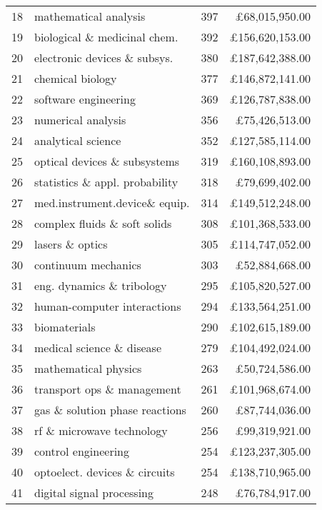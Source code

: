 \begin{spacing}{0.9}
\begin{longtable}[c]{r|>{\raggedleft\arraybackslash}m{6.5cm}|>{\raggedleft\arraybackslash}m{1.9cm}|r}
{18} & {mathematical analysis} & {397} & {\pounds68,015,950.00}\\
{19} & {biological \& medicinal chem.} & {392} & {\pounds156,620,153.00}\\
{20} & {electronic devices \& subsys.} & {380} & {\pounds187,642,388.00}\\
{21} & {chemical biology} & {377} & {\pounds146,872,141.00}\\
{22} & {software engineering} & {369} & {\pounds126,787,838.00}\\
{23} & {numerical analysis} & {356} & {\pounds75,426,513.00}\\
{24} & {analytical science} & {352} & {\pounds127,585,114.00}\\
{25} & {optical devices \& subsystems} & {319} & {\pounds160,108,893.00}\\
{26} & {statistics \& appl. probability} & {318} & {\pounds79,699,402.00}\\
{27} & {med.instrument.device\& equip.} & {314} & {\pounds149,512,248.00}\\
{28} & {complex fluids \& soft solids} & {308} & {\pounds101,368,533.00}\\
{29} & {lasers \& optics} & {305} & {\pounds114,747,052.00}\\
{30} & {continuum mechanics} & {303} & {\pounds52,884,668.00}\\
{31} & {eng. dynamics \& tribology} & {295} & {\pounds105,820,527.00}\\
{32} & {human-computer interactions} & {294} & {\pounds133,564,251.00}\\
{33} & {biomaterials} & {290} & {\pounds102,615,189.00}\\
{34} & {medical science \& disease} & {279} & {\pounds104,492,024.00}\\
{35} & {mathematical physics} & {263} & {\pounds50,724,586.00}\\
{36} & {transport ops \& management} & {261} & {\pounds101,968,674.00}\\
{37} & {gas \& solution phase reactions} & {260} & {\pounds87,744,036.00}\\
{38} & {rf \& microwave technology} & {256} & {\pounds99,319,921.00}\\
{39} & {control engineering} & {254} & {\pounds123,237,305.00}\\
{40} & {optoelect. devices \& circuits} & {254} & {\pounds138,710,965.00}\\
{41} & {digital signal processing} & {248} & {\pounds76,784,917.00}\\

\end{longtable}
\end{spacing}
